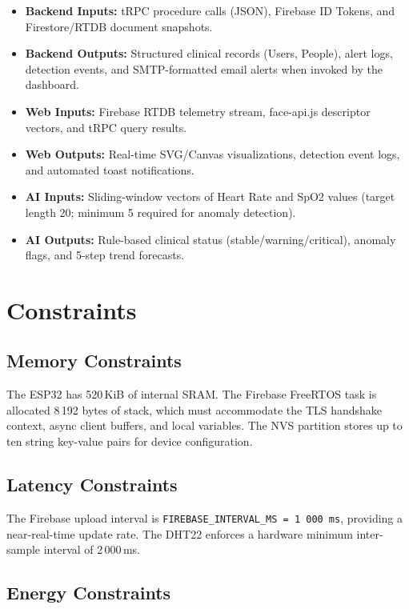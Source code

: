 \begin{itemize}
	\item \textbf{Backend Inputs:} tRPC procedure calls (JSON), Firebase ID Tokens, and Firestore/RTDB document snapshots.
	\item \textbf{Backend Outputs:} Structured clinical records (Users, People), alert logs, detection events, and SMTP-formatted email alerts when invoked by the dashboard.
	\item \textbf{Web Inputs:} Firebase RTDB telemetry stream, face-api.js descriptor vectors, and tRPC query results.
	\item \textbf{Web Outputs:} Real-time SVG/Canvas visualizations, detection event logs, and automated toast notifications.
	\item \textbf{AI Inputs:} Sliding-window vectors of Heart Rate and SpO2 values (target length 20; minimum 5 required for anomaly detection).
	\item \textbf{AI Outputs:} Rule-based clinical status (stable/warning/critical), anomaly flags, and 5-step trend forecasts.
\end{itemize}

\section{Constraints}

\subsection*{Memory Constraints}

The ESP32 has 520\,KiB of internal SRAM.
The Firebase FreeRTOS task is allocated 8\,192 bytes of stack, which must accommodate
the TLS handshake context, async client buffers, and local variables.
The NVS partition stores up to ten string key-value pairs for device configuration.

\subsection*{Latency Constraints}

The Firebase upload interval is \texttt{FIREBASE\_INTERVAL\_MS = 1\,000\,ms},
providing a near-real-time update rate.
The DHT22 enforces a hardware minimum inter-sample interval of 2\,000\,ms.


\subsection*{Energy Constraints}

